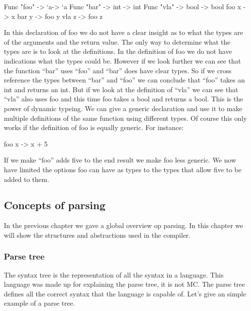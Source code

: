 \begin{code}
	Func "foo" -> ‘a-> ‘a 
	Func "bar" -> int -> int 
	Func "vla" -> bool -> bool 
	foo x -> x 
	bar y -> foo y 
	vla z -> foo z
\end{code}

In this declaration of foo we do not have a clear insight as to what the types are of the arguments and the return value. The only way to determine what the types are is to look at the definitions. In the definition of foo we do not have indications what the types could be. However if we look further we can see that the function “bar” uses “foo” and “bar” does have clear types. So if we cross reference the types between “bar” and “foo” we can conclude that “foo” takes an int and returns an int. 
\linebreak
But if we look at the definition of “vla” we can see that “vla” also uses foo and this time foo takes a bool and returns a bool. This is the power of dynamic typeing. We can give a generic declaration and use it to make multiple definitions of the same function using different types. 
\linebreak
Of course this only works if the definition of foo is equally generic. For instance:

\begin{code}
	foo x -> x + 5 
\end{code}

If we make “foo” adds five to the end result we make foo less generic. We now have limited the options foo can have as types to the types that allow five to be added to them.

\subsection{Concepts of parsing}

In the previous chapter we gave a global overview op parsing. In this chapter we will show the structures and abstractions used in the compiler. 

\subsubsection{Parse tree}

The syntax tree is the representation of all the syntax in a language. This language was made up for explaining the parse tree, it is not MC. The parse tree defines all the correct syntax that the language is capable of. Let’s give an simple example of a parse tree.

